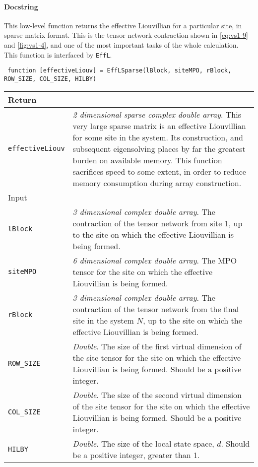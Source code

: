  \paragraph{Docstring} This low-level function returns the effective Liouvillian for a particular site, in sparse matrix format. This is the tensor network contraction shown in \cref{eq:vs1-9} and \cref{fig:vs1-4}, and one of the most important tasks of the whole calculation. This function is interfaced by \lstinline$EffL$.
 \begin{lstlisting}
 function [effectiveLiouv] = EffLSparse(lBlock, siteMPO, rBlock, ROW_SIZE, COL_SIZE, HILBY) \end{lstlisting}
 \begin{longtabu}{X[1,1]X[4,1]}
 \hline
 Return & \\ \hline
 \lstinline$effectiveLiouv$ & \emph{2 dimensional sparse complex double array}. This very large sparse matrix is an effective Liouvillian for some site in the system. Its construction, and subsequent eigensolving places by far the greatest burden on available memory. This function sacrifices speed to some extent, in order to reduce memory consumption during array construction. \\ \hline
 Input & \\ \hline
 \lstinline$lBlock$ & \emph{3 dimensional complex double array}. The contraction of the tensor network from site \(1\), up to the site on which the effective Liouvillian is being formed. \\
 \lstinline$siteMPO$ & \emph{6 dimensional complex double array}. The MPO tensor for the site on which the effective Liouvillian is being formed. \\
 \lstinline$rBlock$ & \emph{3 dimensional complex double array}. The contraction of the tensor network from the final site in the system \(N\), up to the site on which the effective Liouvillian is being formed. \\
 \lstinline$ROW_SIZE$ & \emph{Double}. The size of the first virtual dimension of the site tensor for the site on which the effective Liouvillian is being formed. Should be a positive integer. \\
 \lstinline$COL_SIZE$ & \emph{Double}. The size of the second virtual dimension of the site tensor for the site on which the effective Liouvillian is being formed. Should be a positive integer. \\
 \lstinline$HILBY$ & \emph{Double}. The size of the local state space, \(d\). Should be a positive integer, greater than 1. \\
 \hline
 \end{longtabu}
